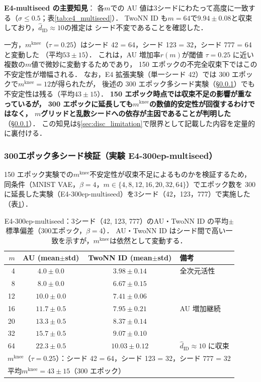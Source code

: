 \documentclass[11pt,a4paper]{jsarticle}
\newcommand{\mknee}{m^{\mathrm{knee}}}
\begin{document}
\textbf{E4-multiseed の主要知見}：
各$m$での AU 値は3シードにわたって高度に一致する（$\sigma \leq 0.5$；表\ref{tab:e4_multiseed}）．
TwoNN ID も$m = 64$で$9.94 \pm 0.08$と収束しており，$\hat{d}_\mathrm{ID} \approx 10$の推定は
シード不変であることを確認した．

一方，$\mknee$（$\tau = 0.25$）はシード 42 = 64，シード 123 = 32，シード 777 = 64 と変動した
（平均$53 \pm 15$）．
これは，AU 増加率$r(m)$が閾値 $\tau = 0.25$ に近い複数の$m$値で微妙に変動するためであり，
150 エポックの不完全収束下ではこの不安定性が増幅される．
なお，E4 拡張実験（単一シード 42）では 300 エポックで$\mknee = 12$が得られたが，
後述の 300 エポック多シード実験（§\ref{sec:exp_multiseed2}）でも不安定性は残る（平均$43 \pm 15$）．
\textbf{150 エポック時点では収束不足の影響が重なっているが，
300 エポックに延長しても$\mknee$の数値的安定性が回復するわけではなく，
$m$グリッドと乱数シードへの依存が主因であることが判明した}（§\ref{sec:exp_multiseed2}）．
この知見は§\ref{sec:disc_limitation}で限界として記載した内容を定量的に裏付ける．

\subsubsection{300エポック多シード検証（実験 E4-300ep-multiseed）}\label{sec:exp_multiseed2}

150 エポック実験での$\mknee$不安定性が収束不足によるものかを検証するため，
同条件（MNIST VAE，$\beta = 4$，$m \in \{4, 8, 12, 16, 20, 32, 64\}$）でエポック数を
300 に延長した実験（E4-300ep-multiseed）を3シード（42，123，777）で実施した（表\ref{tab:e4_300ep_multiseed}）．

\begin{table}[H]
\centering
\caption{E4-300ep-multiseed：3シード（42, 123, 777）のAU・TwoNN ID の平均$\pm$標準偏差（300エポック，$\beta=4$）．
AU・TwoNN ID はシード間で高い一致を示すが，$\mknee$は依然として変動する．}
\label{tab:e4_300ep_multiseed}
\small
\begin{tabular}{rccl}
\toprule
$m$ & AU (mean$\pm$std) & TwoNN ID (mean$\pm$std) & 備考 \\
\midrule
 4 & $4.0 \pm 0.0$ & $3.98 \pm 0.14$ & 全次元活性 \\
 8 & $8.0 \pm 0.0$ & $6.67 \pm 0.15$ & \\
12 & $10.0 \pm 0.0$ & $7.41 \pm 0.06$ & \\
16 & $11.7 \pm 0.5$ & $7.95 \pm 0.21$ & AU 増加継続 \\
20 & $13.3 \pm 0.5$ & $8.37 \pm 0.14$ & \\
32 & $15.7 \pm 0.5$ & $9.07 \pm 0.10$ & \\
64 & $22.3 \pm 0.5$ & $10.03 \pm 0.12$ & $\hat{d}_\mathrm{ID} \approx 10$ に収束 \\
\midrule
\multicolumn{4}{l}{$\mknee$（$\tau=0.25$）：シード 42 = 64，シード 123 = 32，シード 777 = 32} \\
\multicolumn{4}{l}{平均$\mknee = 43 \pm 15$（300 エポック）} \\
\bottomrule
\end{tabular}
\end{table}
\end{document}
